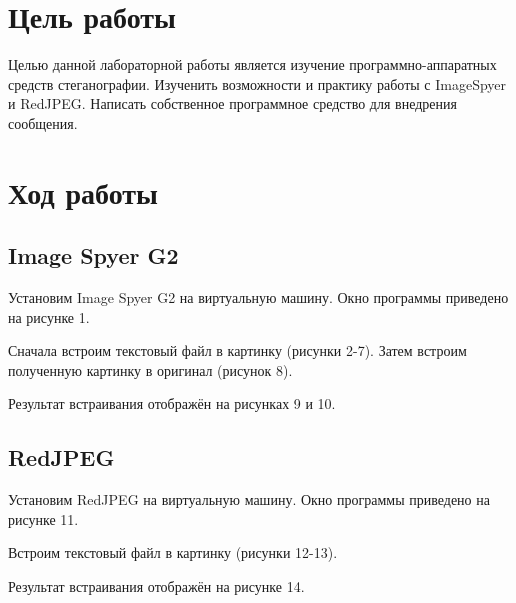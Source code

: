 \section{Цель работы}
Целью данной лабораторной работы является изучение программно-аппаратных средств стеганографии. Изученить возможности и практику работы с ImageSpyer и RedJPEG. Написать собственное программное средство для внедрения сообщения.


\section{Ход работы}

\subsection{Image Spyer G2}
Установим Image Spyer G2 на виртуальную машину. Окно программы приведено на рисунке 1.

\FloatBarrier

Сначала встроим текстовый файл в картинку (рисунки 2-7). Затем встроим полученную картинку в оригинал (рисунок 8).

\FloatBarrier

Результат встраивания отображён на рисунках 9 и 10.

\FloatBarrier


\subsection{RedJPEG}
Установим RedJPEG на виртуальную машину. Окно программы приведено на рисунке 11.

\FloatBarrier

Встроим текстовый файл в картинку (рисунки 12-13). 


\FloatBarrier

Результат встраивания отображён на рисунке 14.

\FloatBarrier


